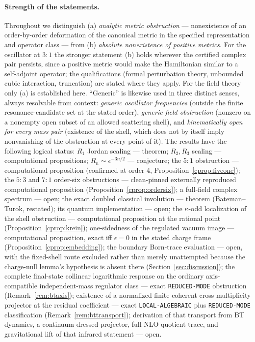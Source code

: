 \documentclass[11pt]{article}
\theoremstyle{definition}
\theoremstyle{remark}
\begin{document}
\paragraph{Strength of the statements.}
Throughout we distinguish (a) \emph{analytic metric obstruction} ---
nonexistence of an order-by-order deformation of the canonical metric
in the specified representation and operator class --- from (b)
\emph{absolute nonexistence of positive metrics}.  For the oscillator
at $3{:}1$ the stronger statement (b) holds wherever the certified
complex pair persists, since a positive metric would make the
Hamiltonian similar to a self-adjoint operator; the qualifications
(formal perturbation theory, unbounded cubic interaction, truncation)
are stated where they apply.  For the field theory only (a) is
established here.  ``Generic'' is likewise used in three distinct
senses, always resolvable from context: \emph{generic oscillator
frequencies} (outside the finite resonance-candidate set at the stated
order), \emph{generic field obstruction} (nonzero on a nonempty open
subset of an allowed scattering shell), and \emph{kinematically open
for every mass pair} (existence of the shell, which does not by itself
imply nonvanishing of the obstruction at every point of it).  The
results have the following logical status: $R_1$ Jordan scaling --- theorem;
$R_2,R_3$ scaling
--- computational propositions; $R_n\sim\epsilon^{-3n/2}$ ---
conjecture; the $5{:}1$ obstruction --- computational proposition
(confirmed at order 4, Proposition~\ref{cprop:fiveone}); the $5{:}3$ and
$7{:}1$ order-six obstructions --- clean-pinned externally reproduced
computational proposition (Proposition~\ref{cprop:ordersix}); a full-field
complex spectrum --- open; the exact doubled classical involution ---
theorem (Bateman--Turok, restated); its quantum implementation ---
open; the $\kappa$-odd localization of the shell obstruction ---
computational proposition at the rational point
(Proposition~\ref{cprop:krein}); one-sidedness of the regulated vacuum
image --- computational proposition, exact iff $\epsilon=0$ in the
stated charge frame (Proposition~\ref{cprop:embedding}); the boundary
Born-trace evaluation --- open, with the fixed-shell route excluded rather
than merely unattempted because the charge-null lemma's hypothesis is absent
there (Section~\ref{sec:discussion}); the complete final-state collinear
logarithmic response on the ordinary axis-compatible independent-mass
regulator class --- exact \texttt{REDUCED-MODE} obstruction
(Remark~\ref{rem:btaxis}); existence of a normalized finite coherent
cross-multiplicity projector at the residual coefficient --- exact
\texttt{LOCAL-ALGEBRAIC} plus \texttt{REDUCED-MODE} classification
(Remark~\ref{rem:bttransport}); derivation of that transport from BT dynamics,
a continuum dressed projector, full NLO quotient trace, and gravitational lift
of that infrared statement --- open.
\end{document}
